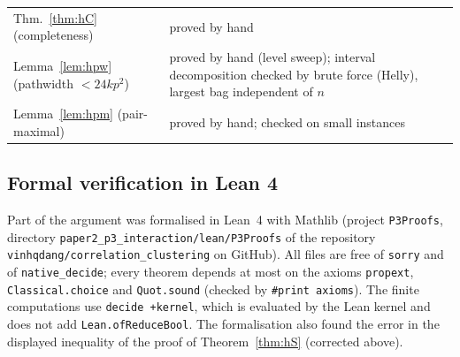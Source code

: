 \begin{center}
\begin{tabular}{@{}p{}p{}@{}}
Thm.~\ref{thm:hC} (completeness) & proved by hand\\
Lemma~\ref{lem:hpw} (pathwidth $<24kp^2$) & proved by hand (level sweep); interval decomposition checked by brute force (Helly), largest bag independent of $n$\\
Lemma~\ref{lem:hpm} (pair-maximal) & proved by hand; checked on small instances\\\hline
\end{tabular}
\end{center}

\subsection{Formal verification in Lean 4}\label{sec:hlean}
Part of the argument was formalised in Lean~4 with Mathlib (project \texttt{P3Proofs}, directory \texttt{paper2\_p3\_interaction/\allowbreak lean/\allowbreak P3Proofs} of the repository \texttt{vinhqdang/\allowbreak correlation\_\allowbreak clustering} on GitHub). All files are free of \texttt{sorry} and of \texttt{native\_decide}; every theorem depends at most on the axioms \texttt{propext}, \texttt{Classical.choice} and \texttt{Quot.sound} (checked by \texttt{\#print axioms}). The finite computations use \texttt{decide +kernel}, which is evaluated by the Lean kernel and does not add \texttt{Lean.ofReduceBool}. The formalisation also found the error in the displayed inequality of the proof of Theorem~\ref{thm:hS} (corrected above).

